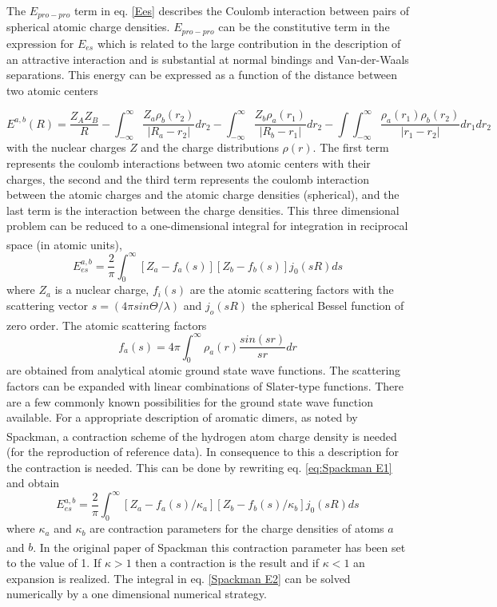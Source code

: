 \documentclass[a4paper,11pt]{scrartcl}
\newcommand{\myCite}[1]{\textsuperscript{\cite{#1}}}
\begin{document}
The $E_{pro-pro}$ term in eq. \ref{Ees} describes the Coulomb interaction
between pairs of spherical atomic charge densities. $E_{pro-pro}$
can be the constitutive term in the expression for $E_{es}$ which
is related to the large contribution in the description of an attractive
interaction and is substantial at normal bindings and Van-der-Waals
separations. This energy can be expressed as a function of the distance
between two atomic centers

\begin{equation}
E^{a,b}(R)=\frac{Z_{A}Z_{B}}{R}-\int_{-\infty}^{\infty}\frac{Z_{a}\rho_{b}(r_{2})}{|R_{a}-r_{2}|}dr_{2}-\int_{-\infty}^{\infty}\frac{Z_{b}\rho_{a}(r_{1})}{|R_{b}-r_{1}|}dr_{2}-\int\int_{-\infty}^{\infty}\frac{\rho_{a}(r_{1})\rho_{b}(r_{2})}{|r_{1}-r_{2}|}dr_{1}dr_{2}
\end{equation}
with the nuclear charges $Z$ and the charge distributions $\rho(r)$.
The first term represents the coulomb interactions between two atomic
centers with their charges, the second and the third term represents
the coulomb interaction between the atomic charges and the atomic
charge densities (spherical), and the last term is the interaction
between the charge densities. This three dimensional problem can be
reduced to a one-dimensional integral for integration in reciprocal
space (in atomic units)\myCite{Spackman1986}, 
\begin{equation}
E_{es}^{a,b}=\frac{2}{\pi}\int_{0}^{\infty}[Z_{a}-f_{a}(s)][Z_{b}-f_{b}(s)]j_{0}(sR)ds\label{eq:Spackman E1}
\end{equation}
where $Z_{a}$ is a nuclear charge, $f_{i}(s)$ are the atomic scattering
factors with the scattering vector $s=(4\pi sin\Theta/\lambda)$ and
$j_{o}(sR)$ the spherical Bessel function of zero order\myCite{Tafipolsky2011}.
The atomic scattering factors
\begin{equation}
f_{a}(s)=4\pi\int_{0}^{\infty}\rho_{a}(r)\frac{sin(sr)}{sr}dr
\end{equation}
are obtained from analytical atomic ground state wave functions. The
scattering factors can be expanded with linear combinations of Slater-type
functions. There are a few commonly known possibilities for the ground
state wave function available. For a appropriate description of aromatic
dimers, as noted by Spackman\myCite{Spackman2006}, a contraction scheme
of the hydrogen atom charge density is needed (for the reproduction
of reference data). In consequence to this a description for the contraction
is needed. This can be done by rewriting eq. \ref{eq:Spackman E1}
and obtain
\begin{equation}
E_{es}^{a,b}=\frac{2}{\pi}\int_{0}^{\infty}[Z_{a}-f_{a}(s)/\kappa_{a}][Z_{b}-f_{b}(s)/\kappa_{b}]j_{0}(sR)ds\label{Spackman E2}
\end{equation}
where $\kappa_{a}$ and $\kappa_{b}$ are contraction parameters for
the charge densities of atoms $a$ and $b$. In the original paper
of Spackman \myCite{Spackman2006} this contraction parameter has been
set to the value of 1. If $\kappa>1$ then a contraction is the result
and if $\kappa<1$ an expansion is realized. The integral in eq. \ref{Spackman E2}
can be solved numerically by a one dimensional numerical strategy.
\end{document}
